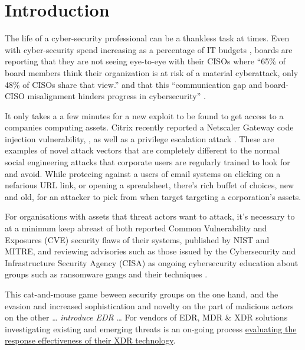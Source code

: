 \section{Introduction}


The life of a cyber-security professional can be a thankless task at times. Even with cyber-security spend increasing as a percentage of IT budgets \autocite{Hiscox:2022},
boards are reporting that they are not seeing eye-to-eye with their CISOs where \enquote{65\% of board members think their organization is at risk of a material
  cyberattack, only 48\% of CISOs share that view.} and that this \enquote{communication gap and board-CISO misalignment hinders progress in cybersecurity}
\autocite{Milica:2023}.


It only takes a a few minutes for a new exploit to be found to get access to a companies computing assets.  Citrix recently reported a Netscaler Gateway code injection
vulnerability, \autocite{CVE-2023-3519}, as well as a privilege escalation attack \autocite{CVE-2023-3467}.  These are examples of novel attack vectors that  are
completely different to the normal social engineering attacks that corporate users are regularly trained to look for and avoid.  While protecing against a users of
email systems on clicking on a nefarious URL link, or opening a spreadsheet, there's rich buffet of choices, new and old, for an attacker to pick from when target
targeting a corporation's assets.

For organisations with assets that threat actors want to attack, it's necessary to at a minimum keep abreast of both reported Common Vulnerability and Exposures (CVE)
security flaws of their systems, published by NIST and MITRE, and reviewing advisories such as those issued by the Cybersecurity and Infrastructure Security Agency (CISA)
as ongoing cybersecurity education about groups such as ransomware gangs and their techniques \autocite{CISA:2023}.


This cat-and-mouse game beween security groups on the one hand, and the evasion and increased sophistication and novelty on the part of malicious actors on the other \ldots
\textit{introduce EDR} \ldots
For vendors of EDR, MDR \& XDR solutions investigating existing and emerging threats is an on-going process \href{https://research.tue.nl/files/305661196/Olteanu_I.C..pdf}{evaluating the response effectiveness of their XDR technology}.


